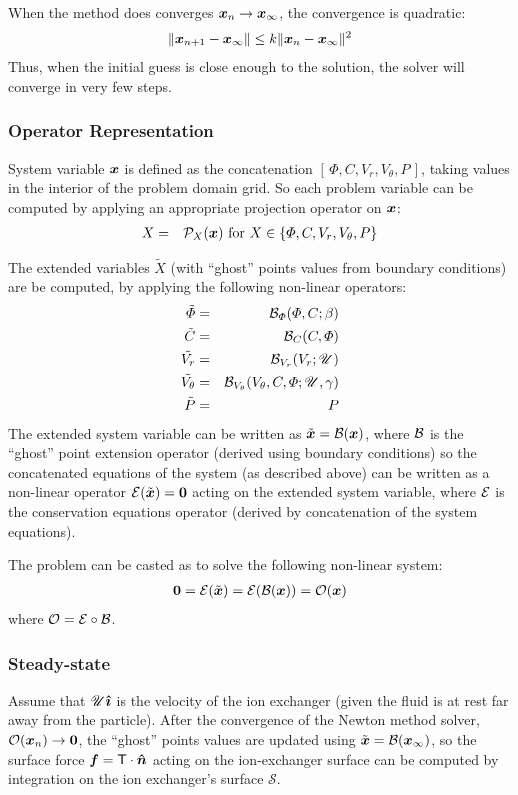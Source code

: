 When the method does converges $\boldsymbol{x}_n \rightarrow \boldsymbol{x}_\infty$, 
the convergence is quadratic:
\begin{eqnarray}
\|\boldsymbol{x}_{n+1} - \boldsymbol{x}_\infty\| \le k \|\boldsymbol{x}_{n} - \boldsymbol{x}_\infty\|^2
\end{eqnarray}
Thus, when the initial guess is close enough to the solution, the solver
will converge in very few steps.


\subsubsection{Operator Representation}
System variable $\boldsymbol{x}$ is defined as the concatenation $[\,\varPhi, C, V_r, V_\theta, P\,]$,
taking values in the interior of the problem domain grid.
So each problem variable can be computed by applying an appropriate projection operator
on $\boldsymbol{x}$:
\begin{eqnarray}
X &=& \mathcal{P}_X(\boldsymbol{x}) \mbox{ for } X \in \left\{\varPhi, C, V_r, V_\theta, P\right\}
\end{eqnarray}

The extended variables $\tilde X$ (with ``ghost'' points values 
from boundary conditions) are be computed, by applying the following non-linear operators:
\begin{eqnarray}
\tilde{\varPhi} &=& \mathcal{B}_\varPhi(\varPhi, C; \beta) \\
\tilde{C} &=& \mathcal{B}_C(C, \varPhi) \\
\tilde{V_r} &=& \mathcal{B}_{V_r}(V_r; \mathscr{U}) \\
\tilde{V_\theta} &=& \mathcal{B}_{V_\theta}(V_\theta, C, \varPhi; \mathscr{U}, \gamma) \\
\tilde{P} &=& P
\end{eqnarray}
The extended system variable can be written as $\tilde{\boldsymbol{x}} = \mathcal{B}(\boldsymbol{x})$, 
where $\mathcal{B}$ is the ``ghost'' point extension operator (derived using boundary conditions)
so the concatenated equations of the system (as described above) can be written 
as a non-linear operator $\mathcal{E}(\tilde{\boldsymbol{x}}) = \boldsymbol{0}$ acting on the extended system variable,
where $\mathcal{E}$ is the conservation equations operator (derived by concatenation of the system
equations).

The problem can be casted as to solve the following non-linear system:
\begin{eqnarray}
\boldsymbol{0} = \mathcal{E} (\tilde{\boldsymbol{x}}) = \mathcal{E} (\mathcal{B} (\boldsymbol{x})) = \mathcal{O}(\boldsymbol{x})
\end{eqnarray}
 where $\mathcal{O} = \mathcal{E} \circ \mathcal{B}$.

\subsubsection{Steady-state}
Assume that $\mathscr{U} \boldsymbol{\hat{\imath}}$ is the velocity of the ion exchanger 
(given the fluid is at rest far away from the particle).
After the convergence of the Newton method solver, $\mathcal{O}(\boldsymbol{x}_n) \rightarrow \boldsymbol{0}$, 
the ``ghost'' points values are updated using $\tilde{\boldsymbol{x}} = \mathcal{B}(\boldsymbol{x}_\infty)$,
so the surface force $\boldsymbol{f} = \mathsf{T} \cdot \boldsymbol{\hat{n}}$ acting on the ion-exchanger surface
can be computed by integration on the ion exchanger's surface $\mathcal S$.

